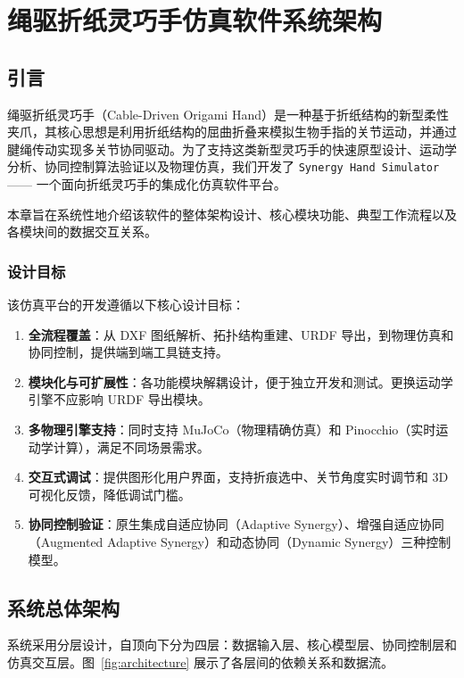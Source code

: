 \documentclass[12pt,a4paper,openany]{book}
\begin{document}
\chapter{绳驱折纸灵巧手仿真软件系统架构}

\section{引言}

绳驱折纸灵巧手（Cable-Driven Origami Hand）是一种基于折纸结构的新型柔性夹爪，其核心思想是利用折纸结构的屈曲折叠来模拟生物手指的关节运动，并通过腱绳传动实现多关节协同驱动。为了支持这类新型灵巧手的快速原型设计、运动学分析、协同控制算法验证以及物理仿真，我们开发了 \texttt{Synergy Hand Simulator} —— 一个面向折纸灵巧手的集成化仿真软件平台。

本章旨在系统性地介绍该软件的整体架构设计、核心模块功能、典型工作流程以及各模块间的数据交互关系。

\subsection{设计目标}

该仿真平台的开发遵循以下核心设计目标：

\begin{enumerate}[leftmargin=*,itemindent=0pt]
    \item \textbf{全流程覆盖}：从 DXF 图纸解析、拓扑结构重建、URDF 导出，到物理仿真和协同控制，提供端到端工具链支持。
    \item \textbf{模块化与可扩展性}：各功能模块解耦设计，便于独立开发和测试。更换运动学引擎不应影响 URDF 导出模块。
    \item \textbf{多物理引擎支持}：同时支持 MuJoCo（物理精确仿真）和 Pinocchio（实时运动学计算），满足不同场景需求。
    \item \textbf{交互式调试}：提供图形化用户界面，支持折痕选中、关节角度实时调节和 3D 可视化反馈，降低调试门槛。
    \item \textbf{协同控制验证}：原生集成自适应协同（Adaptive Synergy）、增强自适应协同（Augmented Adaptive Synergy）和动态协同（Dynamic Synergy）三种控制模型。
\end{enumerate}

\section{系统总体架构}

系统采用分层设计，自顶向下分为四层：数据输入层、核心模型层、协同控制层和仿真交互层。图~\ref{fig:architecture} 展示了各层间的依赖关系和数据流。
\end{document}
